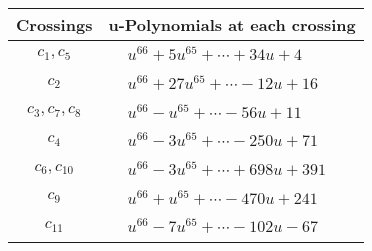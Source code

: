 \documentclass[1p]{elsarticle_modified}
\theoremstyle{definition}
\begin{document}
\begin{tabular}{m{50pt}|m{274pt}}
Crossings & \hspace{64pt}u-Polynomials at each crossing \\
\hline $$\begin{aligned}c_{1},c_{5}\end{aligned}$$&$\begin{aligned}
&u^{66}+5 u^{65}+\cdots+34 u+4
\end{aligned}$\\
\hline $$\begin{aligned}c_{2}\end{aligned}$$&$\begin{aligned}
&u^{66}+27 u^{65}+\cdots-12 u+16
\end{aligned}$\\
\hline $$\begin{aligned}c_{3},c_{7},c_{8}\end{aligned}$$&$\begin{aligned}
&u^{66}- u^{65}+\cdots-56 u+11
\end{aligned}$\\
\hline $$\begin{aligned}c_{4}\end{aligned}$$&$\begin{aligned}
&u^{66}-3 u^{65}+\cdots-250 u+71
\end{aligned}$\\
\hline $$\begin{aligned}c_{6},c_{10}\end{aligned}$$&$\begin{aligned}
&u^{66}-3 u^{65}+\cdots+698 u+391
\end{aligned}$\\
\hline $$\begin{aligned}c_{9}\end{aligned}$$&$\begin{aligned}
&u^{66}+u^{65}+\cdots-470 u+241
\end{aligned}$\\
\hline $$\begin{aligned}c_{11}\end{aligned}$$&$\begin{aligned}
&u^{66}-7 u^{65}+\cdots-102 u-67
\end{aligned}$\\
\hline
\end{tabular}\\~\\
\newpage\renewcommand{\arraystretch}{1}
\end{document}
